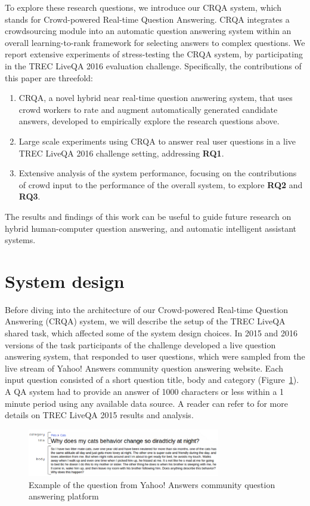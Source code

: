 \documentclass[letterpaper]{article}
\begin{document}
To explore these research questions, we introduce our CRQA system, which stands for Crowd-powered Real-time Question Answering.
CRQA integrates a crowdsourcing module into an automatic question answering system within an overall learning-to-rank framework for selecting answers to complex questions.
We report extensive experiments of stress-testing the CRQA system, by participating in the TREC LiveQA 2016 evaluation challenge.
Specifically, the contributions of this paper are threefold:
\begin{enumerate}
	\item CRQA, a novel hybrid near real-time question answering system, that uses crowd workers to rate and augment automatically generated candidate answers, developed to empirically explore the research questions above.
	\item Large scale experiments using CRQA to answer real user questions in a live TREC LiveQA 2016 challenge setting, addressing \textbf{RQ1}.
	\item Extensive analysis of the system performance, focusing on the contributions of crowd input to the performance of the overall system, to explore \textbf{RQ2} and \textbf{RQ3}.
\end{enumerate}

The results and findings of this work can be useful to guide future research on hybrid human-computer question answering, and automatic intelligent assistant systems.

\section{System design}
\label{sec:system}

Before diving into the architecture of our Crowd-powered Real-time Question Answering (CRQA) system, we will describe the setup of the TREC LiveQA shared task, which affected some of the system design choices.
In 2015 and 2016 versions of the task participants of the challenge developed a live question answering system, that responded to user questions, which were sampled from the live stream of Yahoo! Answers community question answering website.
Each input question consisted of a short question title, body and category (Figure~\ref{fig:ya_question}).
A QA system had to provide an answer of 1000 characters or less within a 1 minute period using any available data source.
A reader can refer to \cite{overviewliveqa15} for more details on TREC LiveQA 2015 results and analysis.

\begin{figure}[h!t]
	\centering
	\includegraphics[width=0.75\textwidth]{img/ya_question}
	\caption{Example of the question from Yahoo! Answers community question answering platform}
	\label{fig:ya_question}
\end{figure}
\end{document}
